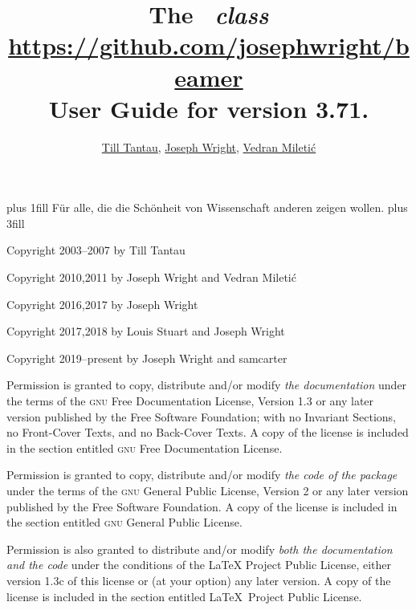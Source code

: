 \documentclass[doc2]{ltxdoc}
\def\beamerugversion{3.71}
\begin{document}
{
  \vbox{}
  \vskip 0pt plus 1fill
  F\"ur alle, die die Sch\"onheit von Wissenschaft anderen zeigen wollen.
  \vskip 0pt plus 3fill

  \parindent 0pt
  Copyright 2003--2007 by Till Tantau

  Copyright 2010,2011 by Joseph Wright and Vedran Mileti\'c

  Copyright 2016,2017 by Joseph Wright
  
  Copyright 2017,2018 by Louis Stuart and Joseph Wright
  
  Copyright 2019--present by Joseph Wright and samcarter

  \medskip
  Permission is granted to copy, distribute and/or modify \emph{the documentation} under the terms of the \textsc{gnu} Free Documentation License, Version 1.3 or any later version published by the Free Software Foundation; with no Invariant Sections, no Front-Cover Texts, and no Back-Cover Texts. A copy of the license is included in the section entitled \textsc{gnu} Free Documentation License.

  \medskip
  Permission is granted to copy, distribute and/or modify \emph{the code of the package} under the terms of the \textsc{gnu} General Public License, Version 2 or any later version published by the Free Software Foundation. A copy of the license is included in the section entitled \textsc{gnu} General Public License.

  \medskip
  Permission is also granted to distribute and/or modify \emph{both the documentation and the code} under the conditions of the LaTeX Project Public License, either version 1.3c of this license or (at your option) any later version. A copy of the license is included in the section entitled \LaTeX\ Project Public License.

  \vbox{}
  \clearpage
}


\title{\Huge The \beamer\ \textit{class}\\
\Large\url{https://github.com/josephwright/beamer}\\
\Large User Guide for version \beamerugversion.}
\author{\href{mailto:tantau@users.sourceforge.net}{Till Tantau}, \href{mailto:joseph.wright@morningstar2.co.uk}{Joseph Wright}, \href{mailto:vmiletic@inf.uniri.hr}{Vedran Mileti\'c}}
\end{document}
